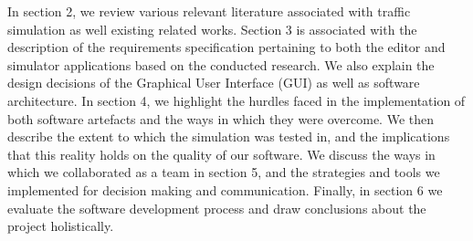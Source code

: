 In section 2, we review various relevant literature associated with traffic simulation as well existing related works. Section 3 is associated with the description of the requirements specification pertaining to both the editor and simulator applications based on the conducted research. We also explain the design decisions of the Graphical User Interface (GUI) as well as software architecture. In section 4, we highlight the hurdles faced in the implementation of both software artefacts and the ways in which they were overcome. We then describe the extent to which the simulation was tested in, and the implications that this reality holds on the quality of our software. We discuss the ways in which we collaborated as a team in section 5, and the strategies and tools we implemented for decision making and communication. Finally, in section 6 we evaluate the software development process and draw conclusions about the project holistically. 